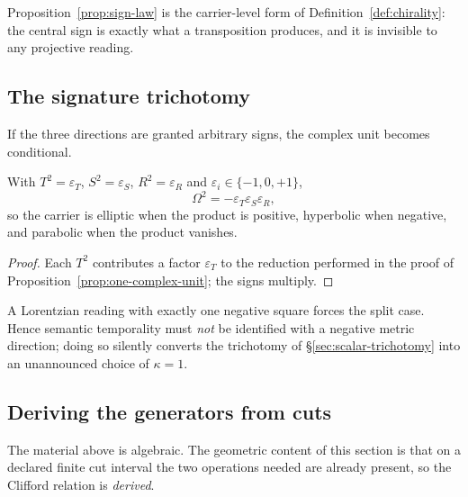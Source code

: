 \begin{remark}
Proposition~\ref{prop:sign-law} is the carrier-level form of
Definition~\ref{def:chirality}: the central sign is exactly what a transposition
produces, and it is invisible to any projective reading.
\end{remark}

\subsection{The signature trichotomy}

If the three directions are granted arbitrary signs, the complex unit becomes
conditional.

\begin{proposition}\label{prop:signature-trichotomy}
With $T^{2}=\varepsilon_T$, $S^{2}=\varepsilon_S$, $R^{2}=\varepsilon_R$ and
$\varepsilon_i\in\{-1,0,+1\}$,
\[
  \Omega^{2}=-\varepsilon_T\varepsilon_S\varepsilon_R ,
\]
so the carrier is elliptic when the product is positive, hyperbolic when negative, and
parabolic when the product vanishes.
\end{proposition}

\begin{proof}
Each $T^{2}$ contributes a factor $\varepsilon_T$ to the reduction performed in the
proof of Proposition~\ref{prop:one-complex-unit}; the signs multiply.
\end{proof}

\begin{warning}\label{warn:temporality}
A Lorentzian reading with exactly one negative square forces the split case.  Hence
semantic temporality must \emph{not} be identified with a negative metric direction;
doing so silently converts the trichotomy of \S\ref{sec:scalar-trichotomy} into an
unannounced choice of $\kappa=1$.
\end{warning}

\subsection{Deriving the generators from cuts}\label{sec:six-state-derivation}

The material above is algebraic.  The geometric content of this section is that on a
declared finite cut interval the two operations needed are already present, so the
Clifford relation is \emph{derived}.


